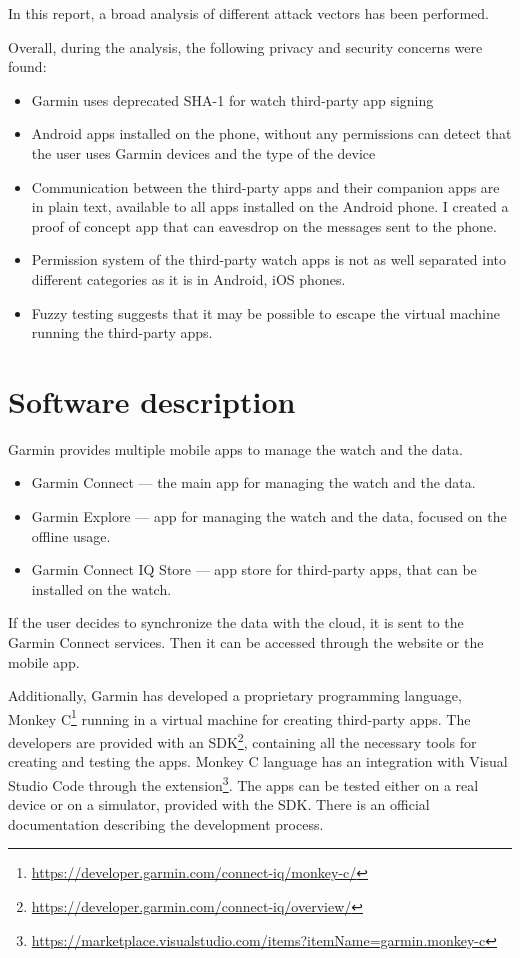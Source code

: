 In this report, a broad analysis of different attack vectors has been performed.

Overall, during the analysis, the following privacy and security concerns were found:
\begin{itemize}
    \item Garmin uses deprecated SHA-1 for watch third-party app signing
    \item Android apps installed on the phone, without any permissions can detect that the user uses Garmin devices and the type of the device
    \item Communication between the third-party apps and their companion apps are in plain text, available to all apps installed on the Android phone.
    I created a proof of concept app that can eavesdrop on the messages sent to the phone.
    \item Permission system of the third-party watch apps is not as well separated into different categories as it is in Android, iOS phones.
    \item Fuzzy testing suggests that it may be possible to escape the virtual machine running the third-party apps.
\end{itemize}


\section{Software description}
Garmin provides multiple mobile apps to manage the watch and the data.
\begin{itemize}
    \item Garmin Connect — the main app for managing the watch and the data.
    \item Garmin Explore — app for managing the watch and the data, focused on the offline usage.
    \item Garmin Connect IQ Store — app store for third-party apps, that can be installed on the watch.
\end{itemize}

If the user decides to synchronize the data with the cloud, it is sent to the Garmin Connect services.
Then it can be accessed through the website or the mobile app.

Additionally, Garmin has developed a proprietary programming language, Monkey C\footnote{\url{https://developer.garmin.com/connect-iq/monkey-c/}} running in a virtual machine for creating third-party apps.
The developers are provided with an SDK\footnote{\url{https://developer.garmin.com/connect-iq/overview/}}, containing all the necessary tools for creating and testing the apps.
Monkey C language has an integration with Visual Studio Code through the extension\footnote{\url{https://marketplace.visualstudio.com/items?itemName=garmin.monkey-c}}.
The apps can be tested either on a real device or on a simulator, provided with the SDK\@.
There is an official documentation describing the development process.

